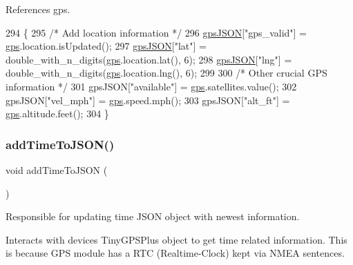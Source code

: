 References gps.


\begin{DoxyCode}
294 \{
295   \textcolor{comment}{/* Add location information */}
296   \hyperlink{logging-device_8ino_a548727e041a5cd3db91bdbd0ccd71e30}{gpsJSON}[\textcolor{stringliteral}{"gps\_valid"}] = \hyperlink{logging-device_8ino_a169c53997a7da1d0fb99aec1b4675ce8}{gps}.location.isUpdated();
297   \hyperlink{logging-device_8ino_a548727e041a5cd3db91bdbd0ccd71e30}{gpsJSON}[\textcolor{stringliteral}{"lat"}] = double\_with\_n\_digits(\hyperlink{logging-device_8ino_a169c53997a7da1d0fb99aec1b4675ce8}{gps}.location.lat(), 6);
298   \hyperlink{logging-device_8ino_a548727e041a5cd3db91bdbd0ccd71e30}{gpsJSON}[\textcolor{stringliteral}{"lng"}] = double\_with\_n\_digits(\hyperlink{logging-device_8ino_a169c53997a7da1d0fb99aec1b4675ce8}{gps}.location.lng(), 6);
299 
300   \textcolor{comment}{/* Other crucial GPS information */}
301   gpsJSON[\textcolor{stringliteral}{"available"}] = \hyperlink{logging-device_8ino_a169c53997a7da1d0fb99aec1b4675ce8}{gps}.satellites.value();
302   gpsJSON[\textcolor{stringliteral}{"vel\_mph"}] = \hyperlink{logging-device_8ino_a169c53997a7da1d0fb99aec1b4675ce8}{gps}.speed.mph();
303   gpsJSON[\textcolor{stringliteral}{"alt\_ft"}] = \hyperlink{logging-device_8ino_a169c53997a7da1d0fb99aec1b4675ce8}{gps}.altitude.feet();
304 \}
\end{DoxyCode}
\mbox{\label{logging-device_8ino_a9e4931f452cd25dfff67d41e7c9c0efb}} 
\subsubsection{\texorpdfstring{add\+Time\+To\+J\+S\+O\+N()}{addTimeToJSON()}}
{\footnotesize\ttfamily void add\+Time\+To\+J\+S\+ON (\begin{DoxyParamCaption}{ }\end{DoxyParamCaption})}



Responsible for updating time J\+S\+ON object with newest information. 

Interacts with devices Tiny\+G\+P\+S\+Plus object to get time related information. This is because G\+PS module has a R\+TC (Realtime-\/\+Clock) kept via N\+M\+EA sentences. 

